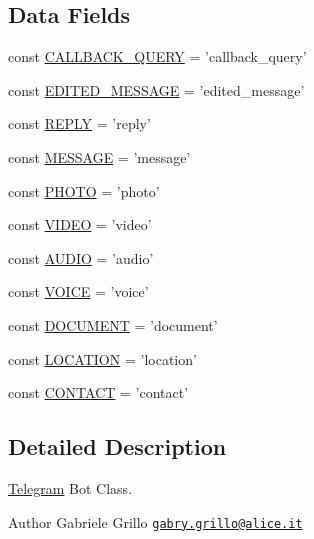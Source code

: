 \subsection*{Data Fields}
\begin{DoxyCompactItemize}
\item 
const \hyperlink{class_telegram_a464a4a095bb928388381b33e0babf9fe}{C\-A\-L\-L\-B\-A\-C\-K\-\_\-\-Q\-U\-E\-R\-Y} = 'callback\-\_\-query'
\item 
const \hyperlink{class_telegram_aa469cc007db1409d59a5e5bfac0633ec}{E\-D\-I\-T\-E\-D\-\_\-\-M\-E\-S\-S\-A\-G\-E} = 'edited\-\_\-message'
\item 
const \hyperlink{class_telegram_acb63774895b195d4c22afe2b089a3ddd}{R\-E\-P\-L\-Y} = 'reply'
\item 
const \hyperlink{class_telegram_af9b451d04eb24044a2d4112be10de570}{M\-E\-S\-S\-A\-G\-E} = 'message'
\item 
const \hyperlink{class_telegram_a0aeb08e94e66f9d958f565530b6b6a80}{P\-H\-O\-T\-O} = 'photo'
\item 
const \hyperlink{class_telegram_a333a9b0a1034beea1b4b505f30885cea}{V\-I\-D\-E\-O} = 'video'
\item 
const \hyperlink{class_telegram_a9f6cfe013372d7de1568a95c871214d1}{A\-U\-D\-I\-O} = 'audio'
\item 
const \hyperlink{class_telegram_a12e48e3d10ee66d0a6ca34c207d8e282}{V\-O\-I\-C\-E} = 'voice'
\item 
const \hyperlink{class_telegram_a6494d627239bf203e03297843bf52053}{D\-O\-C\-U\-M\-E\-N\-T} = 'document'
\item 
const \hyperlink{class_telegram_aca699735a6cec340e45cde5c623bdb32}{L\-O\-C\-A\-T\-I\-O\-N} = 'location'
\item 
const \hyperlink{class_telegram_aac7f4f1b55319f64ad56ae8a8222d9b5}{C\-O\-N\-T\-A\-C\-T} = 'contact'
\end{DoxyCompactItemize}


\subsection{Detailed Description}
\hyperlink{class_telegram}{Telegram} Bot Class.

\begin{DoxyAuthor}{Author}
Gabriele Grillo \href{mailto:gabry.grillo@alice.it}{\tt gabry.\-grillo@alice.\-it} 
\end{DoxyAuthor}


